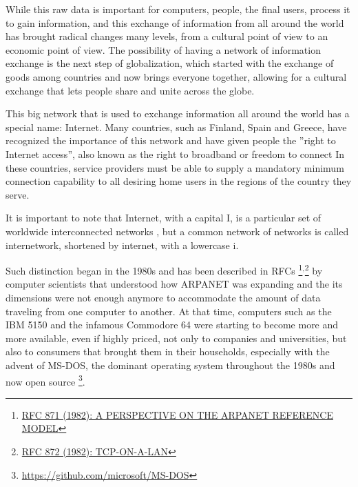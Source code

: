 		While this raw data is important for computers, people, the final users, process it to gain information, and this exchange of information from all around the world has brought radical changes many levels, from a cultural point of view to an economic point of view.
		The possibility of having a network of information exchange is the next step of globalization, which started with the exchange of goods among countries and now brings everyone together, allowing for a cultural exchange that lets people share and unite across the globe.
		
		This big network that is used to exchange information all around the world has a special name: Internet.
		Many countries, such as Finland, Spain and Greece, have recognized the importance of this network and have given people the ''right to Internet access'', also known as the right to broadband or freedom to connect
		In these countries, service providers must be able to supply a mandatory minimum connection capability to all desiring home users in the regions of the country they serve.
		
		It is important to note that Internet, with a capital I, is a particular set of worldwide interconnected networks \cite{gg243376}, but a common network of networks is called internetwork, shortened by internet, with a lowercase i.
		
		Such distinction began in the 1980s and has been described in RFCs \footnote{\href{https://datatracker.ietf.org/doc/html/rfc871}{RFC 871 (1982): A PERSPECTIVE ON THE ARPANET REFERENCE MODEL}}$^{,}$\footnote{\href{https://datatracker.ietf.org/doc/html/rfc872}{RFC 872 (1982): TCP-ON-A-LAN}} by computer scientists that understood how ARPANET was expanding and the its dimensions were not enough anymore to accommodate the amount of data traveling from one computer to another.
		At that time, computers such as the IBM 5150 and the infamous Commodore 64 were starting to become more and more available, even if highly priced, not only to companies and universities, but also to consumers that brought them in their households, especially with the advent of MS-DOS, the dominant operating system throughout the 1980s and now open source \footnote{\url{https://github.com/microsoft/MS-DOS}}.
		

